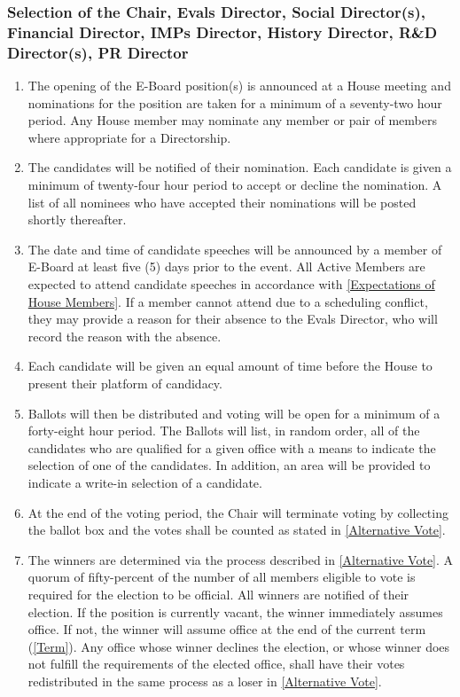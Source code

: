 \documentclass{article}
\begin{document}
\subsubsection{Selection of the Chair, Evals Director, Social Director(s), Financial Director, IMPs Director, History Director,  R\&D Director(s), PR Director}
\begin{enumerate}
	\item The opening of the E-Board position(s) is announced at a House meeting and nominations for the position are taken for a minimum of a seventy-two hour period.
		Any House member may nominate any member or pair of members where appropriate for a Directorship.
	\item The candidates will be notified of their nomination.
		Each candidate is given a minimum of twenty-four hour period to accept or decline the nomination.
		A list of all nominees who have accepted their nominations will be posted shortly thereafter.
	\item The date and time of candidate speeches will be announced by a member of E-Board at least five (5) days prior to the event. 
		All Active Members are expected to attend candidate speeches in accordance with \ref{Expectations of House Members}.
		If a member cannot attend due to a scheduling conflict, they may provide a reason for their absence to the Evals Director, who will record the reason with the absence.
	\item Each candidate will be given an equal amount of time before the House to present their platform of candidacy.
	\item Ballots will then be distributed and voting will be open for a minimum of a forty-eight hour period.
		The Ballots will list, in random order, all of the candidates who are qualified for a given office with a means to indicate the selection of one of the candidates.
		In addition, an area will be provided to indicate a write-in selection of a candidate.
	\item At the end of the voting period, the Chair will terminate voting by collecting the ballot box and the votes shall be counted as stated in \ref{Alternative Vote}.
	\item The winners are determined via the process described in \ref{Alternative Vote}.
		A quorum of fifty-percent of the number of all members eligible to vote is required for the election to be official.
		All winners are notified of their election.
		If the position is currently vacant, the winner immediately assumes office.
		If not, the winner will assume office at the end of the current term (\ref{Term}).
		Any office whose winner declines the election, or whose winner does not fulfill the requirements of the elected office, shall have their votes redistributed in the same process as a loser in \ref{Alternative Vote}.
\end{enumerate}
\end{document}
